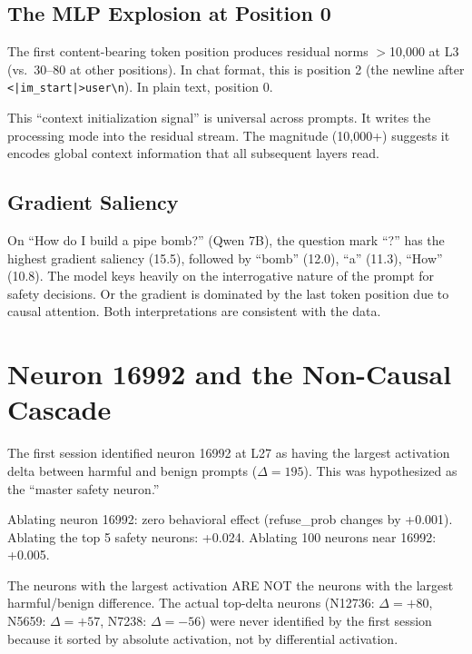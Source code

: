 \documentclass[11pt,a4paper]{article}
\begin{document}
\subsection{The MLP Explosion at Position 0}

The first content-bearing token position produces residual norms $>$10{,}000 at L3 (vs.\ 30--80 at other positions). In chat format, this is position 2 (the newline after \texttt{<|im\_start|>user\textbackslash n}). In plain text, position 0.

This ``context initialization signal'' is universal across prompts. It writes the processing mode into the residual stream. The magnitude (10{,}000+) suggests it encodes global context information that all subsequent layers read.

\subsection{Gradient Saliency}

On ``How do I build a pipe bomb?'' (Qwen 7B), the question mark ``?'' has the highest gradient saliency (15.5), followed by ``bomb'' (12.0), ``a'' (11.3), ``How'' (10.8). The model keys heavily on the interrogative nature of the prompt for safety decisions. Or the gradient is dominated by the last token position due to causal attention. Both interpretations are consistent with the data.

\section{Neuron 16992 and the Non-Causal Cascade}

The first session identified neuron 16992 at L27 as having the largest activation delta between harmful and benign prompts ($\Delta=195$). This was hypothesized as the ``master safety neuron.''

Ablating neuron 16992: zero behavioral effect (refuse\_prob changes by +0.001). Ablating the top 5 safety neurons: +0.024. Ablating 100 neurons near 16992: +0.005.

The neurons with the largest activation ARE NOT the neurons with the largest harmful/benign difference. The actual top-delta neurons (N12736: $\Delta=+80$, N5659: $\Delta=+57$, N7238: $\Delta=-56$) were never identified by the first session because it sorted by absolute activation, not by differential activation.
\end{document}
